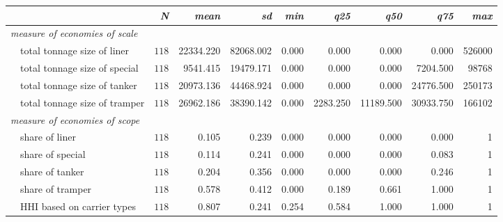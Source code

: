 \begin{tabular}{lrrrrrrrr}
\toprule
\multicolumn{1}{l}{\itshape }&\multicolumn{1}{r}{\itshape N}&\multicolumn{1}{r}{\itshape mean}&\multicolumn{1}{r}{\itshape sd}&\multicolumn{1}{r}{\itshape min}&\multicolumn{1}{r}{\itshape q25}&\multicolumn{1}{r}{\itshape q50}&\multicolumn{1}{r}{\itshape q75}&\multicolumn{1}{r}{\itshape max}\tabularnewline
\midrule
{\itshape measure of economies of scale}&&&&&&&&\tabularnewline
~~total tonnage size of liner&$118$&22334.220&82068.002&0.000&0.000&0.000&0.000&526000\tabularnewline
~~total tonnage size of special&$118$&9541.415&19479.171&0.000&0.000&0.000&7204.500&98768\tabularnewline
~~total tonnage size of tanker&$118$&20973.136&44468.924&0.000&0.000&0.000&24776.500&250173\tabularnewline
~~total tonnage size of tramper&$118$&26962.186&38390.142&0.000&2283.250&11189.500&30933.750&166102\tabularnewline
\midrule
{\itshape measure of economies of scope}&&&&&&&&\tabularnewline
~~share of liner&$118$&0.105&0.239&0.000&0.000&0.000&0.000&1\tabularnewline
~~share of special&$118$&0.114&0.241&0.000&0.000&0.000&0.083&1\tabularnewline
~~share of tanker&$118$&0.204&0.356&0.000&0.000&0.000&0.246&1\tabularnewline
~~share of tramper&$118$&0.578&0.412&0.000&0.189&0.661&1.000&1\tabularnewline
~~HHI based on carrier types&$118$&0.807&0.241&0.254&0.584&1.000&1.000&1\tabularnewline
\bottomrule
\end{tabular}
